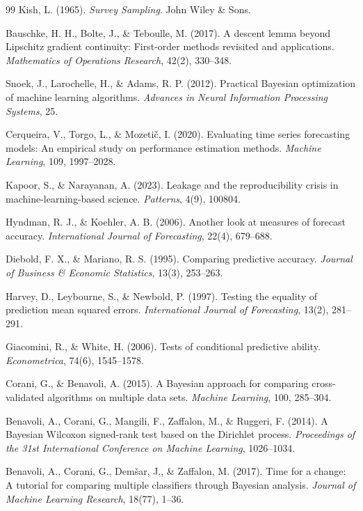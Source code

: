 \documentclass[11pt]{article}
\begin{document}
\begin{thebibliography}{99}
 Kish, L. (1965). \textit{Survey Sampling}. John Wiley \& Sons.

 Bauschke, H. H., Bolte, J., \& Teboulle, M. (2017). A descent lemma beyond Lipschitz gradient continuity: First-order methods revisited and applications. \textit{Mathematics of Operations Research}, 42(2), 330--348.

 Snoek, J., Larochelle, H., \& Adams, R. P. (2012). Practical Bayesian optimization of machine learning algorithms. \textit{Advances in Neural Information Processing Systems}, 25.

 Cerqueira, V., Torgo, L., \& Mozeti\v{c}, I. (2020). Evaluating time series forecasting models: An empirical study on performance estimation methods. \textit{Machine Learning}, 109, 1997--2028.

 Kapoor, S., \& Narayanan, A. (2023). Leakage and the reproducibility crisis in machine-learning-based science. \textit{Patterns}, 4(9), 100804.

 Hyndman, R. J., \& Koehler, A. B. (2006). Another look at measures of forecast accuracy. \textit{International Journal of Forecasting}, 22(4), 679--688.

 Diebold, F. X., \& Mariano, R. S. (1995). Comparing predictive accuracy. \textit{Journal of Business \& Economic Statistics}, 13(3), 253--263.

 Harvey, D., Leybourne, S., \& Newbold, P. (1997). Testing the equality of prediction mean squared errors. \textit{International Journal of Forecasting}, 13(2), 281--291.

 Giacomini, R., \& White, H. (2006). Tests of conditional predictive ability. \textit{Econometrica}, 74(6), 1545--1578.

 Corani, G., \& Benavoli, A. (2015). A Bayesian approach for comparing cross-validated algorithms on multiple data sets. \textit{Machine Learning}, 100, 285--304.

 Benavoli, A., Corani, G., Mangili, F., Zaffalon, M., \& Ruggeri, F. (2014). A Bayesian Wilcoxon signed-rank test based on the Dirichlet process. \textit{Proceedings of the 31st International Conference on Machine Learning}, 1026--1034.

 Benavoli, A., Corani, G., Dem\v{s}ar, J., \& Zaffalon, M. (2017). Time for a change: A tutorial for comparing multiple classifiers through Bayesian analysis. \textit{Journal of Machine Learning Research}, 18(77), 1--36.


\end{thebibliography}
\end{document}
